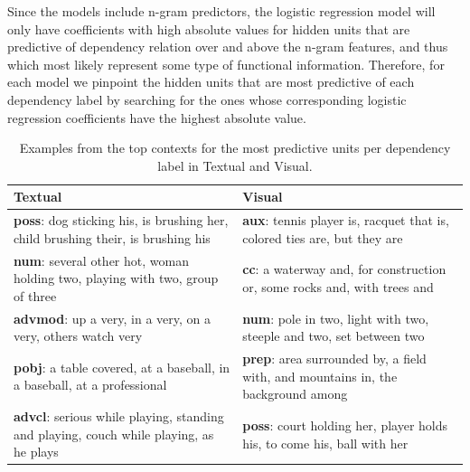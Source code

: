 Since the models include n-gram predictors, the logistic regression model will only
have coefficients with high absolute values for hidden units that are predictive of 
dependency relation over and above the n-gram features, and thus which most 
likely represent some type of functional information. Therefore, for each model 
we pinpoint the hidden units that are most predictive of each dependency label by 
searching for the ones whose corresponding logistic regression coefficients 
have the highest absolute value. 

\begin{table}
\small
\caption{Examples from the top contexts for the most predictive units per dependency label in {\sc Textual} and {\sc Visual}.}
\label{tab:syntax}
\begin{center}
    \begin{tabular}{|p{6cm}| p{6cm}|}
    \hline
   {\sc Textual} & {\sc Visual} \\
    \hline
    {\bf poss}:  dog sticking his, is brushing her, child brushing their, is brushing his &
    {\bf aux}: tennis player is, racquet that is, colored ties are, but they are\\
    \hline
    
    {\bf num}: several other hot, woman holding two, playing with two, group of three &
    {\bf cc}: a waterway and, for construction or, some rocks and, with trees and\\
    \hline

    {\bf advmod}:  up a very, in a very, on a very, others watch very &
    {\bf num}: pole in two, light with two, steeple and two, set between two\\
    \hline

   {\bf pobj}: a table covered, at a baseball, in a baseball, at a professional &
   {\bf prep}: area surrounded by, a field with, and mountains in, the background among\\   
       \hline

   {\bf advcl}: serious while playing, standing and playing, couch while playing, as 
he plays &
   {\bf poss}: court holding her, player holds his, to come his, ball with her \\
   
   \hline
    \end{tabular}
\end{center}
\end{table}


